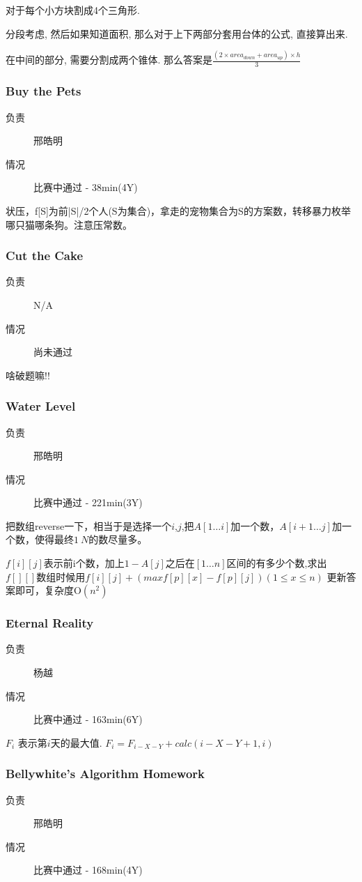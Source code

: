 \documentclass[a4paper, 11pt, nofonts, nocap, fancyhdr]{ctexart}
\newcommand{\problem}[1]{\subsubsection{#1}}
\begin{document}
对于每个小方块割成4个三角形.

分段考虑, 然后如果知道面积, 那么对于上下两部分套用台体的公式, 直接算出来.

在中间的部分, 需要分割成两个锥体. 那么答案是$\frac{(2\times area_{down}+area_{up})\times h}{3}$

\problem{Buy the Pets}

\begin{description}
\item[负责] 邢皓明
\item[情况] 比赛中通过 - 38min(4Y)
\end{description}

状压，f[S]为前|S|/2个人(S为集合)，拿走的宠物集合为S的方案数，转移暴力枚举哪只猫哪条狗。注意压常数。

\problem{Cut the Cake}

\begin{description}
\item[负责] N/A
\item[情况] 尚未通过
\end{description}

啥破题嘛!!

\problem{Water Level}

\begin{description}
\item[负责] 邢皓明
\item[情况] 比赛中通过 - 221min(3Y)
\end{description}

把数组reverse一下，相当于是选择一个$i$,$j$,把$A[1 \dots i]$加一个数，$A[i+1 \dots j]$加一个数，使得最终$1~N$的数尽量多。

$f[i][j]$表示前i个数，加上$1 - A[j]$之后在$[1 \dots n]$区间的有多少个数,求出$f[][]$数组时候用$f[i][j] + (max{f[p][x]} - f[p][j])(1\leq x \leq n)$ 更新答案即可，复杂度O$(n^2)$

\problem{Eternal Reality}

\begin{description}
\item[负责] 杨越
\item[情况] 比赛中通过 - 163min(6Y)
\end{description}

$F_i$ 表示第$i$天的最大值. $F_i = F_{i-X-Y} + calc(i-X-Y+1, i)$ 

\problem{Bellywhite's Algorithm Homework}

\begin{description}
\item[负责] 邢皓明
\item[情况] 比赛中通过 - 168min(4Y)
\end{description}
\end{document}
